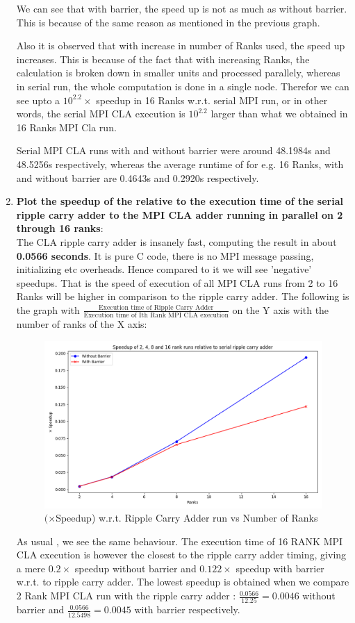 \documentclass[a4paper,12 pt]{article}
\begin{document}
\begin{enumerate}
We can see that with barrier, the speed up is not as much as without barrier. This is because of the same reason as mentioned in the previous graph. 

Also it is observed that with increase in number of Ranks used, the speed up increases. This is because of the fact that with increasing Ranks, the calculation is broken down in smaller units and processed parallely, whereas in serial run, the whole computation is done in a single node. Therefor we can see upto a $10^{2.2} \times$ speedup in 16 Ranks w.r.t. serial MPI run, or in other words, the serial MPI CLA execution is $10^{2.2}$ larger than what we obtained in 16 Ranks MPI Cla run.

Serial MPI CLA runs with and without barrier were around 48.1984s and 48.5256s respectively, whereas the average runtime of for e.g. 16 Ranks, with and without barrier are 0.4643s and 0.2920s respectively. 


\item \textbf{Plot the speedup of the relative to the execution time of the serial ripple carry adder
to the MPI CLA adder running in parallel on 2 through 16 ranks}:\\

The CLA ripple carry adder is insanely fast, computing the result in about \textbf{0.0566 seconds}. It is pure C code, there is no MPI message passing, initializing etc overheads. Hence compared to it we will see 'negative' speedups. That is the speed of execution of all MPI CLA runs from 2 to 16 Ranks will be higher in comparison to the ripple carry adder. The following is the graph with $\frac{\text{Execution time of Ripple Carry Adder}}{\text{Execution time of Ith Rank MPI CLA execution}}$ on the Y axis with the number of ranks of the X axis:

\begin{figure}[H]
	\centering
	\includegraphics[width=.8\linewidth]{Graphs/graph_3.png}
  \caption{$(\times $Speedup) w.r.t. Ripple Carry Adder run vs Number of Ranks}
\end{figure}

As usual , we see the same behaviour. The execution time of 16 RANK MPI CLA execution is however the closest to the ripple carry adder timing, giving a mere $0.2\times$ speedup without barrier and $0.122 \times$ speedup with barrier w.r.t. to ripple carry adder. The lowest speedup is obtained when we compare 2 Rank MPI CLA run with the ripple carry adder : $\frac{0.0566}{12.25} = 0.0046$ without barrier and $\frac{0.0566}{12.5498} = 0.0045$ with barrier respectively.


\end{enumerate}
\end{document}
